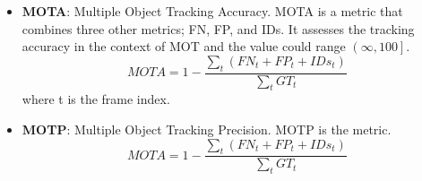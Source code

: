 \begin{itemize}
\item \textbf{MOTA}: Multiple Object Tracking Accuracy. MOTA is a metric that combines three other metrics; FN, FP, and IDs. It assesses the tracking accuracy in the context of MOT and the value could range $\left( \infty, 100 \right]$.
\begin{equation}
MOTA = 1 - \frac{\sum_{t} (FN_{t} + FP_{t} + IDs_{t})}{\sum_{t}GT_{t}}
\end{equation}
where t is the frame index.

\item \textbf{MOTP}: Multiple Object Tracking Precision. MOTP is the metric.
\begin{equation}
MOTA = 1 - \frac{\sum_{t} (FN_{t} + FP_{t} + IDs_{t})}{\sum_{t}GT_{t}}
\end{equation}


\end{itemize}

